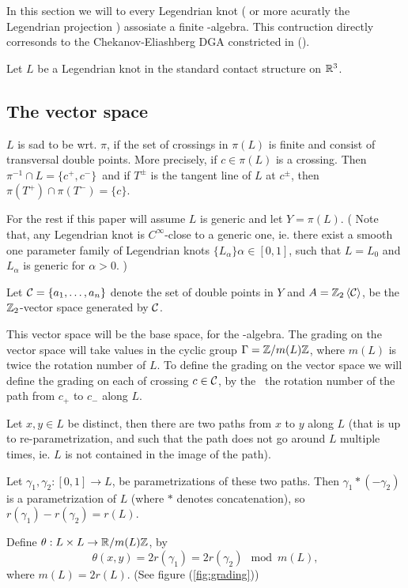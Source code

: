 
In this section we will to every Legendrian knot ( or more acuratly the
Legendrian projection ) assosiate a finite \Ainf-algebra. This contruction
directly corresonds to the Chekanov-Eliashberg DGA constricted in
(\cite{chekanov02}).

Let $L$ be a Legendrian knot in the standard contact structure on $\mathbb{R}^3$.

\subsection{The vector space}
\begin{defn}
$L$ is sad to be  wrt. $\pi$, if the set of crossings in $\pi(L)$
is finite and consist of transversal double points. More precisely, if $c\in
\pi(L)$ is a crossing. Then $\pi^{-1} \cap L = \{ c^+, c^- \}$ and if $T^\pm$
is the tangent line of $L$ at $c^\pm$, then $\pi(T^+) \cap \pi(T^-) = \{c\}$.
\end{defn}

For the rest if this paper will assume $L$ is generic and let $Y = \pi(L)$. ( Note that, any Legendrian knot is $C^\infty$-close to a generic one,
ie. there exist a smooth one parameter family of Legendrian knots $\{L_\alpha
\}\alpha \in [0,1]$, such that $L = L_0$ and $L_\alpha$ is generic for $\alpha >
0$. ) 

\begin{defn}
Let $\mathcal{C} = \{ a_1, \dots, a_n\}$ denote the set of double points in $Y$ and
$A = \mathbb{Z}_2\left<\mathcal{C}\right>$, be the $\mathbb{Z}_2$-vector space generated by $\mathcal{C}$.
\end{defn}

This vector space will be the base space, for the \Ainf-algebra. The grading 
on the vector space will take values in the cyclic group $\Gamma = \mathbb{Z} / m(L) \mathbb{Z}$, 
where $m(L)$ is twice the rotation number of $L$. To define the grading on the
vector space we will define the grading on each of crossing $c \in \mathcal{C}$, by the  
the rotation number of the path from $c_+$ to $c_-$ along $L$.

\begin{defn}
\label{def:theta_map}
Let $x, y \in L$ be distinct, then there are two paths from $x$
to $y$ along $L$ (that is up to re-parametrization, and such that the path
does not go around $L$ multiple times, ie. $L$ is not contained in the image
of the path).

Let $\gamma_1, \gamma_2: [0,1] \to L$, be parametrizations of these two paths.
Then $\gamma_1 * (-\gamma_2)$ is a parametrization of $L$ (where $*$
denotes concatenation), so $r(\gamma_1) - r(\gamma_2) = r(L)$.

Define $\theta: L \times L \to \mathbb{R} / m(L) \mathbb{Z}$, by 
\[ \theta(x,y) = 2 r(\gamma_1) = 2 r(\gamma_2) \mod m(L),  \]
where $m(L) = 2r(L)$. (See figure (\ref{fig:grading}))
\end{defn}

